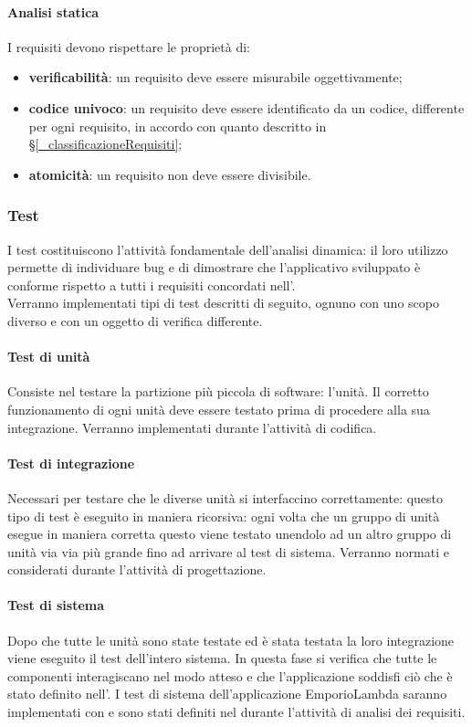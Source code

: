 \paragraph{Analisi statica}
I requisiti devono rispettare le proprietà di:
\begin{itemize}
    \item \textbf{verificabilità}: un requisito deve essere misurabile oggettivamente;
    \item \textbf{codice univoco}: un requisito deve essere identificato da un codice, differente per ogni requisito, in accordo con quanto descritto in \S\ref{_classificazioneRequisiti};
    \item \textbf{atomicità}: un requisito non deve essere divisibile.
\end{itemize}

\subsubsection{Test}
I test costituiscono l'attività fondamentale dell'analisi dinamica: il loro utilizzo permette di individuare bug e di dimostrare che l'applicativo sviluppato è conforme rispetto a tutti i requisiti concordati nell'.\\
Verranno implementati tipi di test descritti di seguito, ognuno con uno scopo diverso e con un oggetto di verifica differente.
\paragraph{Test di unità}
Consiste nel testare la partizione più piccola di software: l'unità. Il corretto funzionamento di ogni unità deve essere testato prima di procedere alla sua integrazione.
Verranno implementati durante l'attività di codifica.

\paragraph{Test di integrazione}
Necessari per testare che le diverse unità si interfaccino correttamente: questo tipo di test è eseguito in maniera ricorsiva: ogni volta che un gruppo di unità esegue in maniera corretta questo viene testato unendolo ad un altro gruppo di unità via via più grande fino ad arrivare al test di sistema.
Verranno normati e considerati durante l'attività di progettazione.

\paragraph{Test di sistema}
Dopo che tutte le unità sono state testate ed è stata testata la loro integrazione viene eseguito il test dell'intero sistema. In questa fase si verifica che tutte le componenti interagiscano nel modo atteso e che l'applicazione soddisfi ciò che è stato definito nell'.
I test di sistema dell'applicazione EmporioLambda saranno implementati con  e sono stati definiti nel  durante l'attività di analisi dei requisiti.

